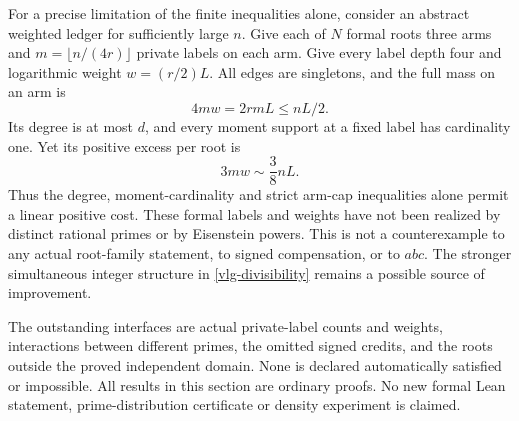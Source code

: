 For a precise limitation of the finite inequalities alone, consider
an abstract weighted ledger for sufficiently large \(n\). Give each
of \(N\) formal roots three arms and
\(m=\lfloor n/(4r)\rfloor\) private labels on each arm. Give every
label depth four and logarithmic weight \(w=(r/2)L\). All edges are
singletons, and the full mass on an arm is
\[
 4mw=2rmL\leq nL/2.
\]
Its degree is at most \(d\), and every moment support at a fixed
label has cardinality one. Yet its positive excess per root is
\[
 3mw\sim \frac38 nL.
\]
Thus the degree, moment-cardinality and strict arm-cap inequalities
alone permit a linear positive cost. These formal labels and
weights have not been realized by distinct rational primes or by
Eisenstein powers. This is not a counterexample to any actual
root-family statement, to signed compensation, or to \(abc\).
The stronger simultaneous integer structure in
\eqref{vlg-divisibility} remains a possible source of improvement.

The outstanding interfaces are actual private-label counts and
weights, interactions between different primes, the omitted signed
credits, and the roots outside the proved independent domain.
None is declared automatically satisfied or impossible.
All results in this section are ordinary proofs. No new formal
Lean statement, prime-distribution certificate or density experiment
is claimed.
